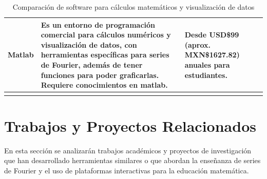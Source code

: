 \begin{longtable}{ | m{2.5cm} | m{6.5cm} | m{4cm} | }
	Matlab  & Es un entorno de programación comercial para cálculos numéricos y visualización de datos, con herramientas específicas para series de Fourier, además de tener funciones para poder graficarlas. Requiere conocimientos en matlab.~\cite{MathWorks2024} & Desde USD\$99 (aprox. MXN\$1627.82) anuales para estudiantes.\\ \hline	
	\rowcolor{white}\caption{Comparación de software para cálculos matemáticos y visualización de datos} \label{tabla:software} \\
\end{longtable}

\section{Trabajos y Proyectos Relacionados}
En esta sección se analizarán trabajos académicos y proyectos de investigación que han desarrollado herramientas similares o que abordan la enseñanza de series de Fourier y el uso de plataformas interactivas para la educación matemática. 

